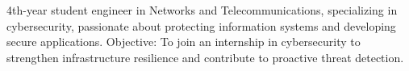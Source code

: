 

\begin{cvparagraph}

4th-year student engineer in Networks and Telecommunications, specializing in cybersecurity, passionate about protecting information systems and developing secure applications.
Objective: To join an internship in cybersecurity to strengthen infrastructure resilience and contribute to proactive threat detection.

\end{cvparagraph}
